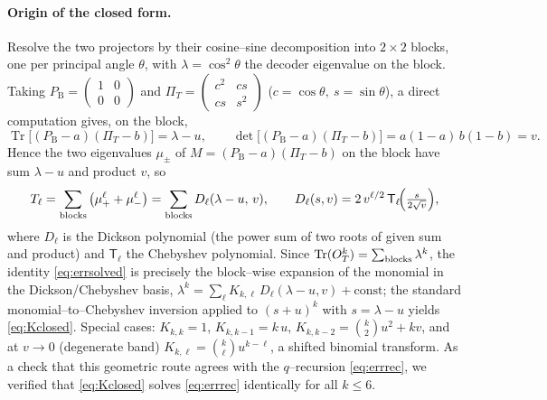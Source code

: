 \documentclass[11pt]{article}
\newcommand{\Tr}{\operatorname{Tr}}
\newcommand{\PB}{P_{\mathrm B}}
\newcommand{\PiT}{\Pi_T}
\newcommand{\OT}{O_T}
\begin{document}
\paragraph{Origin of the closed form.} Resolve the two projectors by their cosine--sine decomposition
into $2\times2$ blocks, one per principal angle $\theta$, with $\lambda=\cos^2\theta$ the decoder
eigenvalue on the block. Taking $\PB=\left(\begin{smallmatrix}1&0\\0&0\end{smallmatrix}\right)$ and
$\PiT=\left(\begin{smallmatrix}c^2&cs\\cs&s^2\end{smallmatrix}\right)$ ($c=\cos\theta,\ s=\sin\theta$),
a direct computation gives, on the block,
\begin{equation}
  \Tr\big[(\PB-a)(\PiT-b)\big]=\lambda-u ,\qquad
  \det\big[(\PB-a)(\PiT-b)\big]=a(1-a)\,b(1-b)=v .
  \label{eq:blockTrDet}
\end{equation}
Hence the two eigenvalues $\mu_\pm$ of $M=(\PB-a)(\PiT-b)$ on the block have sum $\lambda-u$ and product
$v$, so
\begin{equation}
  T_\ell=\sum_{\rm blocks}\big(\mu_+^\ell+\mu_-^\ell\big)=\sum_{\rm blocks}D_\ell(\lambda-u,\,v),
  \qquad D_\ell(s,v)=2\,v^{\ell/2}\,\mathsf T_\ell\!\Big(\tfrac{s}{2\sqrt v}\Big),
  \label{eq:dickson}
\end{equation}
where $D_\ell$ is the Dickson polynomial (the power sum of two roots of given sum and product) and
$\mathsf T_\ell$ the Chebyshev polynomial. Since $\Tr(\OT^k)=\sum_{\rm blocks}\lambda^k$, the identity
\eqref{eq:errsolved} is precisely the block--wise expansion of the monomial in the Dickson/Chebyshev
basis, $\lambda^k=\sum_\ell K_{k,\ell}\,D_\ell(\lambda-u,v)+\text{const}$; the standard
monomial--to--Chebyshev inversion applied to $(s+u)^k$ with $s=\lambda-u$ yields \eqref{eq:Kclosed}.
Special cases: $K_{k,k}=1$, $K_{k,k-1}=k\,u$, $K_{k,k-2}=\binom k2u^2+kv$, and at $v\to0$ (degenerate
band) $K_{k,\ell}=\binom{k}{\ell}u^{k-\ell}$, a shifted binomial transform. As a check that this
geometric route agrees with the $q$--recursion \eqref{eq:errrec}, we verified that \eqref{eq:Kclosed}
solves \eqref{eq:errrec} identically for all $k\le6$.
\end{document}
